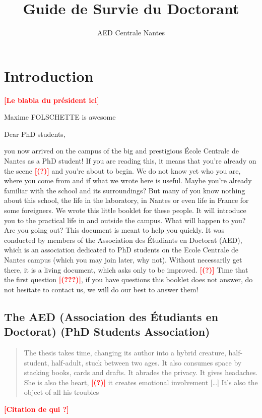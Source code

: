 \documentclass[11pt]{report}
\title{Guide de Survie du Doctorant}
\author{AED Centrale Nantes}
\newcommand{\todo}[1]{\textcolor{red}{\textbf{[#1]}}}
\begin{document}
    \maketitle

\setcounter{page}{0}
\tableofcontents

\newpage
\chapter*{Introduction}
\todo{Le blabla du président ici}

Maxime FOLSCHETTE is awesome

Dear PhD students,

you now arrived on the campus of the big and prestigious École Centrale de Nantes as a PhD student!
If you are reading this, it means that you're already on the scene \todo{(?)} and you're about to begin.
We do not know yet who you are, where you come from and if what we wrote here is useful.
Maybe you're already familiar with the school and its surroundings?
But many of you know nothing about this school, the life in the laboratory, in Nantes or even life in France for some foreigners.
We wrote this little booklet for these people.
It will introduce you to the practical life in and outside the campus.
What will happen to you? Are you going out? This document is meant to help you quickly.
It was conducted by members of the Association des Étudiants en Doctorat (AED), which is an association dedicated to PhD students on the Ecole Centrale de Nantes campus (which you may join later, why not).
Without necessarily get there, it is a living document, which asks only to be improved. \todo{(?)}
Time that the first question \todo{(???)}, if you have questions this booklet does not answer, do not hesitate to contact us, we will do our best to answer them!

\section*{The AED (Association des Étudiants en Doctorat) (PhD Students Association)}
\begin{quotation}
The thesis takes time, changing its author into a hybrid creature, half-student, half-adult, stuck between two ages.
It also consumes space by stacking books, cards and drafts. It abrades the privacy. It gives headaches.
She is also the heart, \todo{(?)} it creates emotional involvement [\dots] It's also the object of all his troubles
\end{quotation}
\todo{Citation de qui ?}
\end{document}

